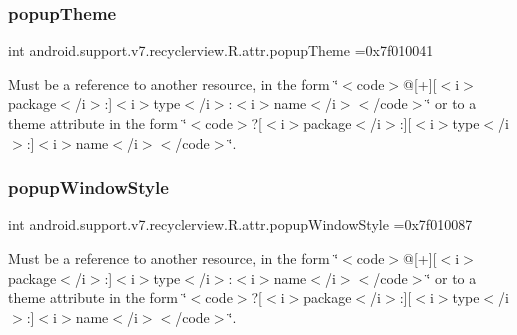 \subsubsection{\texorpdfstring{popup\+Theme}{popupTheme}}
{\footnotesize\ttfamily int android.\+support.\+v7.\+recyclerview.\+R.\+attr.\+popup\+Theme =0x7f010041\hspace{0.3cm}{\ttfamily [static]}}

Must be a reference to another resource, in the form \char`\"{}$<$code$>$@\mbox{[}+\mbox{]}\mbox{[}$<$i$>$package$<$/i$>$\+:\mbox{]}$<$i$>$type$<$/i$>$\+:$<$i$>$name$<$/i$>$$<$/code$>$\char`\"{} or to a theme attribute in the form \char`\"{}$<$code$>$?\mbox{[}$<$i$>$package$<$/i$>$\+:\mbox{]}\mbox{[}$<$i$>$type$<$/i$>$\+:\mbox{]}$<$i$>$name$<$/i$>$$<$/code$>$\char`\"{}. \mbox{\label{classandroid_1_1support_1_1v7_1_1recyclerview_1_1R_1_1attr_a531d6ff7772368ed77ab012f444f2bc1}} 
\subsubsection{\texorpdfstring{popup\+Window\+Style}{popupWindowStyle}}
{\footnotesize\ttfamily int android.\+support.\+v7.\+recyclerview.\+R.\+attr.\+popup\+Window\+Style =0x7f010087\hspace{0.3cm}{\ttfamily [static]}}

Must be a reference to another resource, in the form \char`\"{}$<$code$>$@\mbox{[}+\mbox{]}\mbox{[}$<$i$>$package$<$/i$>$\+:\mbox{]}$<$i$>$type$<$/i$>$\+:$<$i$>$name$<$/i$>$$<$/code$>$\char`\"{} or to a theme attribute in the form \char`\"{}$<$code$>$?\mbox{[}$<$i$>$package$<$/i$>$\+:\mbox{]}\mbox{[}$<$i$>$type$<$/i$>$\+:\mbox{]}$<$i$>$name$<$/i$>$$<$/code$>$\char`\"{}. \mbox{\label{classandroid_1_1support_1_1v7_1_1recyclerview_1_1R_1_1attr_af0782475eb2c9808c420f204688a15b4}} 
